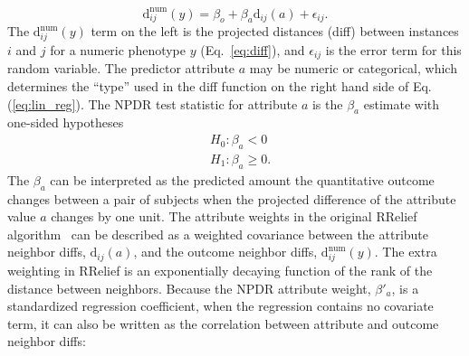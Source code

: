 \documentclass[10pt]{article}
\begin{document}

%
%
\begin{equation}\label{eq:lin_reg}
    \text{d}^{\text{num}}_{ij}(y) = \beta_{o} + \beta_{a} \text{d}_{ij}(a) + \epsilon_{ij}.
\end{equation}
The $\text{d}^{\text{num}}_{ij}(y)$ term on the left is the projected distances (diff) between instances $i$ and $j$ for a numeric phenotype $y$ (Eq.~\ref{eq:diff}), and $\epsilon_{ij}$ is the error term for this random variable. The predictor attribute $a$ may be numeric or categorical, which determines the ``type'' used in the diff function on the right hand side of Eq.(\ref{eq:lin_reg}). The NPDR test statistic for attribute $a$ is the $\beta_a$ estimate with one-sided hypotheses
\begin{equation}\label{eq:linreg_null}
\begin{aligned}
    & H_0: \beta_a < 0 \\
    & H_1: \beta_a \ge 0.
\end{aligned}
\end{equation}
The $\beta_a$ can be interpreted as the predicted amount the quantitative outcome changes between a pair of subjects when the projected difference of the attribute value $a$ changes by one unit. The attribute weights in the original RRelief algorithm~\cite{robnik2003theoretical} can be described as a weighted covariance between the attribute neighbor diffs, $\text{d}_{ij}(a)$, and the outcome neighbor diffs, $\text{d}^{\text{num}}_{ij}(y)$. The extra weighting in RRelief is an exponentially decaying function of the rank of the distance between neighbors. Because the NPDR attribute weight, $\beta'_a$, is a standardized regression coefficient, when the regression contains no covariate term, it can also be written as the correlation between attribute and outcome neighbor diffs:
\end{document}
